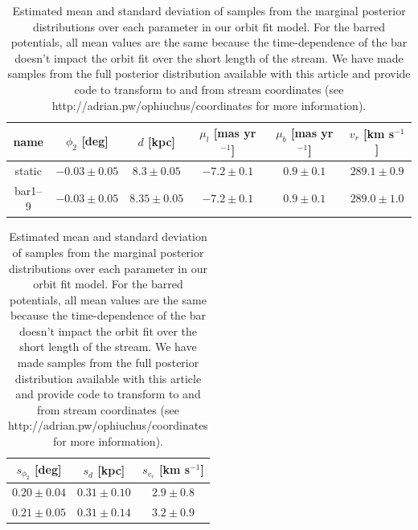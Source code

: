 \documentclass[letterpaper,12pt,preprint]{aastex}
\begin{document}
\begin{table}[ht]
\footnotesize
\begin{center}
	\begin{tabular}{cccccc}
	\toprule
	name & $\phi_2$ [deg] & $d$ [kpc] & $\mu_l$ [mas yr$^{-1}$] & $\mu_b$ [mas yr$^{-1}$] & $v_r$ [km s$^{-1}$]\\\midrule
	static & $-0.03\pm0.05$ & $8.3\pm0.05$ & $-7.2\pm0.1$ & $0.9\pm0.1$ & $289.1\pm0.9$\\
	bar1--9 & $-0.03\pm0.05$ & $8.35\pm0.05$ & $-7.2\pm0.1$ & $0.9\pm0.1$ & $289.0\pm1.0$\\
	\bottomrule
	\end{tabular}
	
	\begin{tabular}{ccc}
	\toprule
	$s_{\phi_2}$ [deg] & $s_{d}$ [kpc] & $s_{v_r}$ [km s$^{-1}$]\\\midrule
	$0.20\pm0.04$ & $0.31\pm0.10$ & $2.9\pm0.8$\\
	$0.21\pm0.05$ & $0.31\pm0.14$ & $3.2\pm0.9$\\
	\bottomrule
	\end{tabular}
	\caption{Estimated mean and standard deviation of samples from the marginal posterior distributions over each parameter in our orbit fit model. For the barred potentials, all mean values are the same because the time-dependence of the bar doesn't impact the orbit fit over the short length of the stream. We have made samples from the full posterior distribution available with this article and provide code to transform to and from stream coordinates (see http://adrian.pw/ophiuchus/coordinates for more information).\label{tbl:param-means} }
\end{center}
\end{table}
\end{document}
